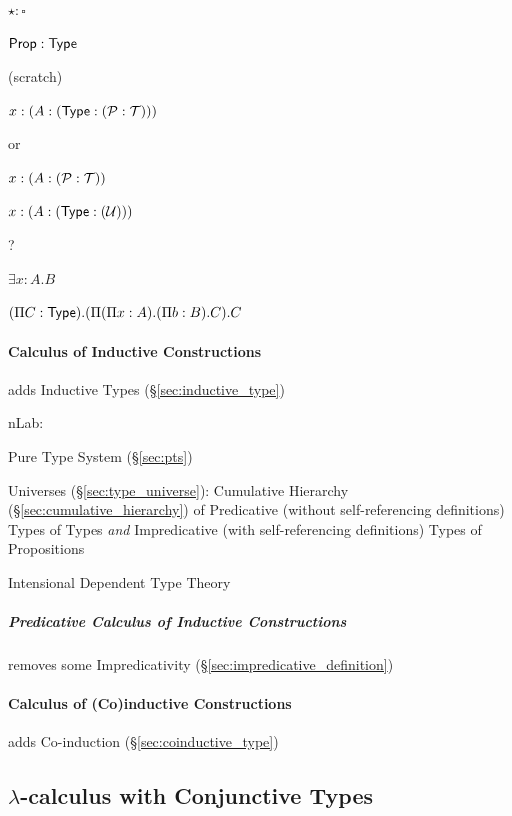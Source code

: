 $\star:\square$

$\mathsf{Prop}:\mathsf{Type}$


\asterism


(scratch)

$x:(A:(\mathsf{Type}:(\mathcal{P}:\mathcal{T})))$

or

$x:(A:(\mathcal{P}:\mathcal{T}))$

$x:(A:(\mathsf{Type}:(\mathcal{U})))$

?


$\exists x:A.B$

$(\Pi C:\mathsf{Type}).(\Pi (\Pi x:A).(\Pi b:B).C).C$



\paragraph{Calculus of Inductive Constructions}\label{sec:cic}\hfill

adds Inductive Types (\S\ref{sec:inductive_type})

nLab:

Pure Type System (\S\ref{sec:pts})

Universes (\S\ref{sec:type_universe}): Cumulative Hierarchy
(\S\ref{sec:cumulative_hierarchy}) of Predicative (without self-referencing
definitions) Types of Types \emph{and} Impredicative (with self-referencing
definitions) Types of Propositions %

Intensional Dependent Type Theory



\subparagraph{Predicative Calculus of Inductive Constructions}
\label{sec:pcic}\hfill

removes some Impredicativity (\S\ref{sec:impredicative_definition})



\paragraph{Calculus of (Co)inductive Constructions}
\label{sec:coinductive_calculus}\hfill

adds Co-induction (\S\ref{sec:coinductive_type})



\subsection{$\lambda$-calculus with Conjunctive Types}
\label{sec:conjunctive_lambda}

